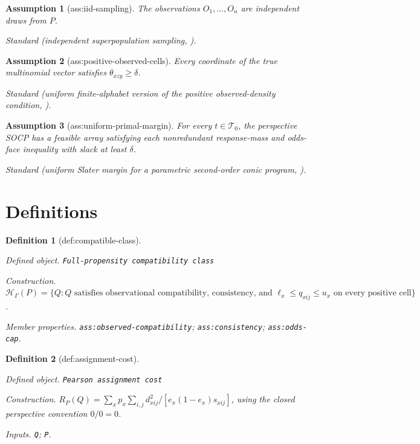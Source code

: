 \documentclass{article}
\newtheorem{assumption}{Assumption}
\newtheorem{definition}{Definition}
\begin{document}
\begin{assumption}[ass:iid-sampling]\label{ass:iid-sampling}
The observations \(O_1,\ldots,O_n\) are independent draws from \(P\).
\par\smallskip\noindent\emph{Standard} (independent superpopulation sampling, \cite{ZhangZhao2026AverageCase}).
\end{assumption}

\begin{assumption}[ass:positive-observed-cells]\label{ass:positive-observed-cells}
Every coordinate of the true multinomial vector satisfies \(\theta_{xzy}\geq\delta\).
\par\smallskip\noindent\emph{Standard} (uniform finite-alphabet version of the positive observed-density condition, \cite{ZhangZhao2026AverageCase}).
\end{assumption}

\begin{assumption}[ass:uniform-primal-margin]\label{ass:uniform-primal-margin}
For every \(t\in\mathcal T_0\), the perspective SOCP has a feasible array satisfying each nonredundant response-mass and odds-face inequality with slack at least \(\delta\).
\par\smallskip\noindent\emph{Standard} (uniform Slater margin for a parametric second-order conic program, \cite{DuanZhangZhang2018SOCP}).
\end{assumption}

\section{Definitions}

\begin{definition}[def:compatible-class]\label{def:compatible-class}
\par\smallskip\noindent\emph{Defined object.} \texttt{Full-\allowbreak{}propensity compatibility class}
\par\smallskip\noindent\emph{Construction.} \(\mathcal H_\Gamma(P)=\{Q: Q\text{ satisfies observational compatibility, consistency, and }\ell_x\leq q_{xij}\leq u_x\text{ on every positive cell}\}\).
\par\smallskip\noindent\emph{Member properties.} \texttt{ass:\allowbreak{}observed-\allowbreak{}compatibility}; \texttt{ass:\allowbreak{}consistency}; \texttt{ass:\allowbreak{}odds-\allowbreak{}cap}.
\end{definition}

\begin{definition}[def:assignment-cost]\label{def:assignment-cost}
\par\smallskip\noindent\emph{Defined object.} \texttt{Pearson assignment cost}
\par\smallskip\noindent\emph{Construction.} \(R_P(Q)=\sum_xp_x\sum_{i,j}d_{xij}^2/[e_x(1-e_x)s_{xij}]\), using the closed perspective convention \(0/0=0\).
\par\smallskip\noindent\emph{Inputs.} \texttt{Q}; \texttt{P}.
\end{definition}
\end{document}
